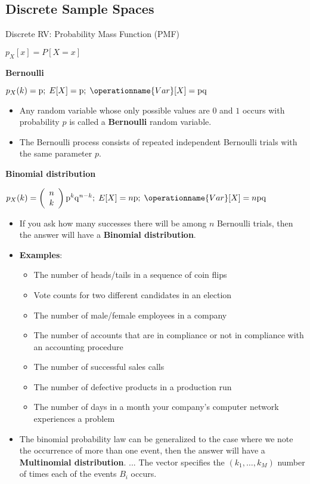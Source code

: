 \documentclass{../cheat}
\begin{document}
\begin{multicols}{3}
	\subsection{Discrete Sample Spaces}
	Discrete RV: Probability Mass Function (PMF)
	\\ \centerline{$p_X[x] = P[X = x]$}
	
	\textbf{Bernoulli}
	\\ \centerline{ $p_X(k)=\mathrm{p}	;\; E[X]=\mathrm{p} ;\;  \operationname{Var}[X]=\mathrm{p}\mathrm{q}$}
	\begin{itemize}
		\item Any random variable whose only possible values are $0$ and $1$ occurs with probability $p$ is called a \textbf{Bernoulli} random variable.
		\item The Bernoulli process consists of repeated independent Bernoulli trials with the same
parameter $p$.
	\end{itemize}

	
	\textbf{Binomial distribution}
	\\ \centerline{ $p_X(k)=\left( {\begin{array}{*{20}c} n \\ k \\ \end{array}} \right) \mathrm{p}^k \mathrm{q}^{n-k}
		;\; E[X]=n\mathrm{p} ;\;  \operationname{Var}[X]=n\mathrm{p}\mathrm{q}
	$}
	\begin{itemize}
		\item If you ask how many successes there will be among $n$ Bernoulli trials, then the answer will have a \textbf{Binomial distribution}.
		\item \textbf{Examples}:
		\begin{itemize}
			\item The number of heads/tails in a sequence of coin flips
			\item Vote counts for two different candidates in an election
			\item The number of male/female employees in a company
			\item The number of accounts that are in compliance or not in compliance with an accounting procedure
			\item The number of successful sales calls
			\item The number of defective products in a production run
			\item The number of days in a month your company’s computer network experiences a problem
		\end{itemize}
		\item The binomial probability law can be generalized to the case where we note the occurrence of more than one event, then the answer will have a \textbf{Multinomial distribution}.	... The vector specifies the $(k_1, \ldots, k_M)$ number of times each of the events $B_i$ occurs.
		

\end{itemize}
\end{multicols}
\end{document}
